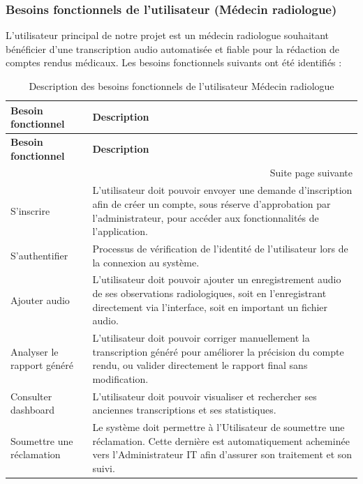 \documentclass[12pt,a4paper]{report}
\begin{document}
\subsubsection{Besoins fonctionnels de l'utilisateur (Médecin radiologue)}
L'utilisateur principal de notre projet est un médecin radiologue souhaitant bénéficier d'une transcription audio automatisée et fiable pour la rédaction de comptes rendus médicaux. Les besoins fonctionnels suivants ont été identifiés :

\begin{longtable}{|p{5cm}|p{10cm}|}
\caption{Description des besoins fonctionnels de l'utilisateur Médecin radiologue} \\
\hline
\textbf{Besoin fonctionnel} & \textbf{Description} \\
\hline
\endfirsthead
\hline
\textbf{Besoin fonctionnel} & \textbf{Description} \\
\hline
\endhead
\hline
\multicolumn{2}{|r|}{{Suite page suivante}} \\
\hline
\endfoot
\hline
\endlastfoot

S'inscrire & L'utilisateur doit pouvoir envoyer une demande d'inscription afin de créer un compte, sous réserve d'approbation par l'administrateur, pour accéder aux fonctionnalités de l'application.\\
\hline
S'authentifier & Processus de vérification de l'identité de l'utilisateur lors de la connexion au système. \\
\hline
Ajouter audio & L'utilisateur doit pouvoir ajouter un enregistrement audio de ses observations radiologiques, soit en l'enregistrant directement via l'interface, soit en important un fichier audio. \\
\hline
Analyser le rapport généré &
L'utilisateur doit pouvoir corriger manuellement la transcription généré pour améliorer la précision du compte rendu, ou valider directement le rapport final sans modification. \\
\hline
Consulter dashboard & L'utilisateur doit pouvoir visualiser et rechercher ses anciennes transcriptions et ses statistiques. \\
\hline
Soumettre une réclamation & Le système doit permettre à l'Utilisateur de soumettre une réclamation. Cette dernière est automatiquement acheminée vers l'Administrateur IT afin d'assurer son traitement et son suivi. \\

\end{longtable}
\end{document}
